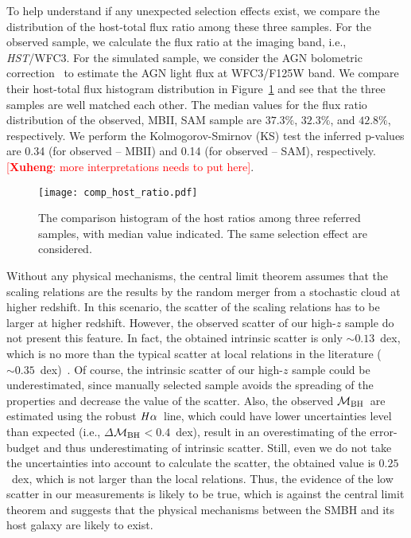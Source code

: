 \documentclass{natureprintstyle}
\newcommand{\hst}{{\it HST}}
\newcommand{\mbh}{$\mathcal M_{\rm BH}$}
\newcommand{\halpha}{${\it H}\alpha$}
\newcommand{\ding}[1]{\textcolor{red}{[{\bf Xuheng}: #1]}}
\begin{document}
To help understand if any unexpected selection effects exist, we compare the distribution of the host-total flux ratio among these three samples. For the observed sample, we calculate the flux ratio at the imaging band, i.e., \hst/WFC3. For the simulated sample, we consider the AGN bolometric correction~\cite{Elvis1994} to estimate the AGN light flux at WFC3/F125W band. We compare their host-total flux histogram distribution in Figure~\ref{fig:comp_hist} and see that the three samples are well matched each other. The median values for the flux ratio distribution of the observed, MBII, SAM sample are $37.3\%$, $32.3\%$, and $42.8\%$, respectively. We perform the Kolmogorov-Smirnov (KS) test the inferred p-values are 0.34 (for observed -- MBII) and 0.14 (for observed -- SAM), respectively. \ding{more interpretations needs to put here}.

\begin{figure}[t]
\texttt{[image: comp\_host\_ratio.pdf]}
\caption{The comparison histogram of the host ratios among three referred samples, with median value indicated. The same selection effect are considered.
}
\label{fig:comp_hist}
\end{figure}

Without any physical mechanisms, the central limit theorem assumes that the scaling relations are the results by the random merger from a stochastic cloud at higher redshift. In this scenario, the scatter of the scaling relations has to be larger at higher redshift. However, the observed scatter of our high-$z$ sample do not present this feature. In fact, the obtained intrinsic scatter is only $\sim0.13$~dex, which is no more than the typical scatter at local relations in the literature ($\sim0.35$~dex)~\cite{Kormendy13, Gul++09}. Of course, the intrinsic scatter of our high-$z$ sample could be underestimated, since manually selected sample avoids the spreading of the properties and decrease the value of the scatter. Also, the observed \mbh\ are estimated using the robust \halpha\ line, which could have lower uncertainties level than expected (i.e., $\Delta$\mbh$<0.4$~dex), result in an overestimating of the error-budget and thus underestimating of intrinsic scatter. Still, even we do not take the uncertainties into account to calculate the scatter, the obtained value is $0.25$~dex, which is not larger than the local relations. Thus, the evidence of the low scatter in our measurements is likely to be true, which is against the central limit theorem and suggests that the physical mechanisms between the SMBH and its host galaxy are likely to exist. 
\end{document}
